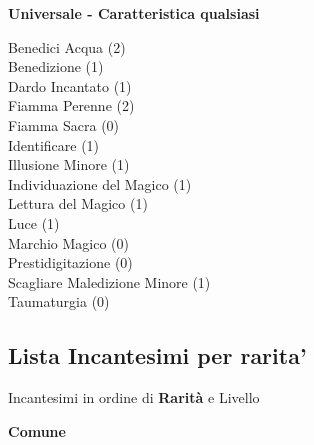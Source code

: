 \begin{multicols}{3}
{	\medskip\textbf{Universale - Caratteristica qualsiasi}

	Benedici Acqua (2)\\
	Benedizione (1)\\
	Dardo Incantato (1)\\
	Fiamma Perenne (2)\\
	Fiamma Sacra (0)\\
	Identificare (1)\\
	Illusione Minore (1)\\
	Individuazione del Magico (1)\\
	Lettura del Magico (1)\\
	Luce (1)\\
	Marchio Magico (0)\\
	Prestidigitazione (0)\\
	Scagliare Maledizione Minore (1)\\
	Taumaturgia (0)\\

	\subsection{Lista Incantesimi per rarita'}

	Incantesimi in ordine di \textbf{Rarità} e Livello

	\medskip\textbf{Comune}\medskip

}
\end{multicols}
